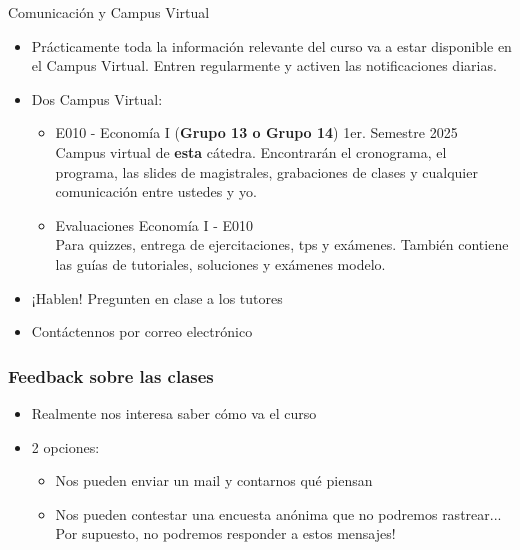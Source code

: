 \documentclass{beamer}
\begin{document}
\begin{frame}{Comunicación y Campus Virtual}
    \begin{itemize}
        \item Prácticamente toda la información relevante del curso va a estar disponible en el Campus Virtual. Entren regularmente y activen las notificaciones diarias. \vspace{2mm}
        \item Dos Campus Virtual: \vspace{2mm}
        \begin{itemize}
            \item E010 - Economía I (\textbf{Grupo 13 o Grupo 14}) 1er. Semestre 2025 \\
            Campus virtual de \textbf{esta} cátedra. Encontrarán el cronograma, el programa, las slides de magistrales, grabaciones de clases y cualquier comunicación entre ustedes y yo. \vspace{2mm}
            \item Evaluaciones Economía I - E010
            \\ Para quizzes, entrega de ejercitaciones, tps y exámenes. También contiene las guías de tutoriales, soluciones y exámenes modelo.  \vspace{2mm}
        \end{itemize}
        \item ¡Hablen! Pregunten en clase a los tutores \vspace{2mm}
        \item Contáctennos por correo electrónico 
    \end{itemize}
\end{frame}

\begin{frame}
    \frametitle{Feedback sobre las clases}
    \begin{itemize}
        \item Realmente nos interesa saber cómo va el curso
        \item 2 opciones:
        \begin{itemize}
            \item Nos pueden enviar un mail y contarnos qué piensan 
            \item Nos pueden contestar una encuesta anónima que no podremos rastrear... Por supuesto, no podremos responder a estos mensajes!
        \end{itemize}
    \end{itemize}
\end{frame}
\end{document}
